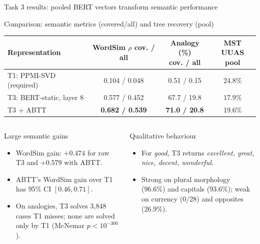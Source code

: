 \documentclass[aspectratio=169,9pt]{beamer}
\newcommand{\tightitem}{\setlength{\itemsep}{0.14em}\setlength{\parskip}{0pt}}
\begin{document}
\begin{frame}{Task 3 results: pooled BERT vectors transform semantic performance}
\begin{block}{Comparison: semantic metrics (covered/all) and tree recovery (pool)}
\centering
\small
\begin{tabular}{lccc}
  \toprule
  \textbf{Representation} & \shortstack{\textbf{WordSim $\rho$}\\cov. / all} & \shortstack{\textbf{Analogy (\%)}\\cov. / all} & \shortstack{\textbf{MST UUAS}\\pool}\\
  \midrule
  T1: PPMI-SVD (required) & 0.104 / 0.048 & 0.51 / 0.15 & 24.8\%\\
  T3: BERT-static, layer 8 & 0.577 / 0.452 & 67.7 / 19.8 & 17.9\%\\
  T3 + ABTT & \textbf{0.682 / 0.539} & \textbf{71.0 / 20.8} & 19.6\%\\
  \bottomrule
\end{tabular}
\end{block}
\begin{columns}[T,onlytextwidth]
  \begin{exampleblock}{Large semantic gains}
    \begin{itemize}\tightitem
      \item WordSim gain: $+0.474$ for raw T3 and $+0.579$ with ABTT.
      \item ABTT's WordSim gain over T1 has 95\% CI $[0.46,0.71]$.
      \item On analogies, T3 solves 3,848 cases T1 misses; none are solved only by T1 (McNemar $p<10^{-300}$).
    \end{itemize}
  \end{exampleblock}
  \begin{block}{Qualitative behaviour}
    \begin{itemize}\tightitem
      \item For \textit{good}, T3 returns \textit{excellent, great, nice, decent, wonderful}.
      \item Strong on plural morphology (96.6\%) and capitals (93.6\%); weak on currency (0/28) and opposites (26.9\%).
    \end{itemize}
  \end{block}
\end{columns}
\vspace{0.1em}
\end{frame}
\end{document}

